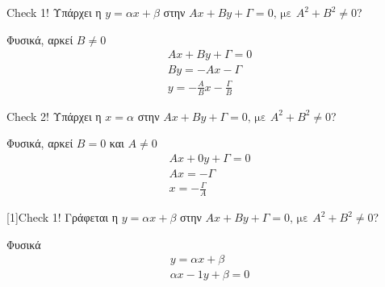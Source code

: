 \documentclass[greek]{beamer}
\begin{document}
\begin{frame}{Check 1!}
  Υπάρχει η $y=αx+β$ στην $Αx+Βy+Γ=0 \text{, με } Α^2+Β^2\ne 0$?

   Φυσικά, αρκεί $Β\ne 0$
  \begin{align*}
    Αx+Βy+Γ=0 \\
    Βy=-Αx-Γ  \\
    y=-\frac{Α}{Β}x-\frac{Γ}{Β}
  \end{align*}
\end{frame}

\begin{frame}{Check 2!}
  Υπάρχει η $x=α$ στην $Αx+Βy+Γ=0 \text{, με } Α^2+Β^2\ne 0$?

   Φυσικά, αρκεί $Β=0$ και $Α\ne 0$
  \begin{align*}
    Αx+0y+Γ=0 \\
    Αx=-Γ     \\
    x=-\frac{Γ}{Α}
  \end{align*}
\end{frame}

\begin{frame}{\scalebox{-1}[1]{Check 1!}}
  Γράφεται η $y=αx+β$ στην $Αx+Βy+Γ=0 \text{, με } Α^2+Β^2\ne 0$?

   Φυσικά
  \begin{align*}
    y=αx+β \\
    αx-1y+β=0
  \end{align*}
\end{frame}
\end{document}
